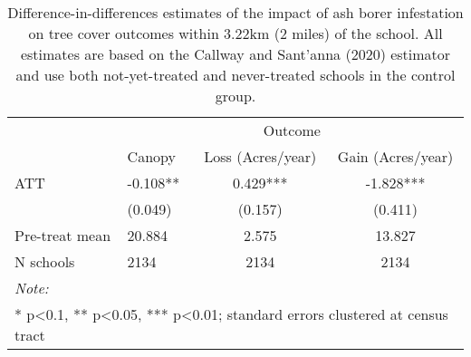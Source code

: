 \begin{table}[!h]

\caption{\label{tab:school-tree-table}Difference-in-differences estimates of the impact of ash borer infestation on tree cover outcomes within 3.22km (2 miles) of the school. All estimates are based on the Callway and Sant'anna (2020) estimator and use both not-yet-treated and never-treated schools in the control group.}
\centering
\begin{tabular}[t]{llcc}
\toprule
\multicolumn{1}{c}{ } & \multicolumn{3}{c}{Outcome} \\
\cmidrule(l{3pt}r{3pt}){2-4}
  & Canopy & Loss (Acres/year) & Gain (Acres/year)\\
\midrule
ATT & -0.108** & 0.429*** & -1.828***\\
 & (0.049) & (0.157) & (0.411)\\
\midrule
Pre-treat mean & 20.884 & 2.575 & 13.827\\
N schools & 2134 & 2134 & 2134\\
\bottomrule
\multicolumn{4}{l}{\rule{0pt}{1em}\textit{Note: }}\\
\multicolumn{4}{l}{\rule{0pt}{1em}* p<0.1, ** p<0.05, *** p<0.01; standard errors clustered at census tract}\\
\end{tabular}
\end{table}
